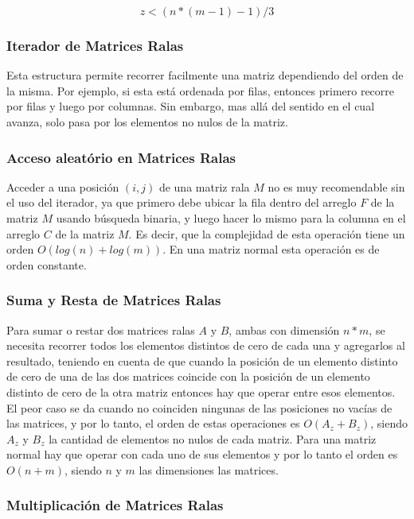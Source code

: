 \[
z <  (n * (m - 1) - 1) / 3
\]

\subsubsection{Iterador de Matrices Ralas}

Esta estructura permite recorrer facilmente una matriz dependiendo del
orden de la misma. Por ejemplo, si esta está ordenada por filas, entonces
primero recorre por filas y luego por columnas. Sin embargo, mas allá del
sentido en el cual avanza, solo pasa por los elementos no nulos de la matriz.

\subsubsection{Acceso aleatório en Matrices Ralas}

Acceder a una posición $(i, j)$ de una matriz rala $M$ no es muy recomendable
sin el uso del iterador, ya que primero debe ubicar la fila dentro del arreglo
$F$ de la matriz $M$ usando búsqueda binaria, y luego hacer lo mismo para la
columna en el arreglo $C$ de la matriz $M$. Es decir, que la complejidad de
esta operación tiene un orden $O(log(n) + log(m))$. En una matriz normal esta
operación es de orden constante.

\subsubsection{Suma y Resta de Matrices Ralas}

Para sumar o restar dos matrices ralas $A$ y $B$, ambas con dimensión $n * m$,
se necesita recorrer todos los elementos distintos de cero de cada una y
agregarlos al resultado, teniendo en cuenta de que cuando la posición de un
elemento distinto de cero de una de las dos matrices coincide con la posición de
un elemento distinto de cero de la otra matriz entonces hay que operar entre
esos elementos. El peor caso se da cuando no coinciden ningunas de las
posiciones no vacías de las matrices, y por lo tanto, el orden de estas
operaciones es $O(A_z + B_z)$, siendo $A_z$ y $B_z$ la cantidad de elementos no
nulos de cada matriz. Para una matriz normal hay que operar con cada uno de sus
elementos y por lo tanto el orden es $O(n + m)$, siendo $n$ y $m$ las
dimensiones las matrices.

\subsubsection{Multiplicación de Matrices Ralas}

